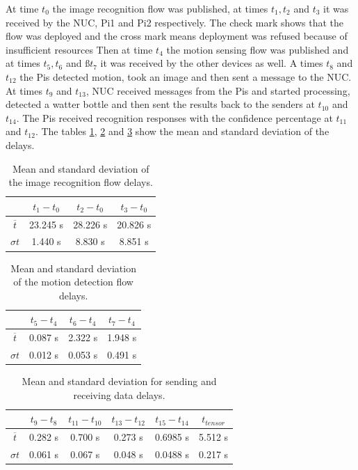 \noindent At time $t_0$ the image recognition flow was published, at times $t_1, t_2$ and   $t_3$ it was received by the NUC, Pi1 and Pi2 respectively. The check mark shows that the flow was deployed and the cross mark means deployment was refused because of insufficient resources Then at time $t_4$ the motion sensing flow was published and at times $t_5,t_6$ and $ßt_7$ it was received by the other devices as well. A times $t_8$ and $t_{12}$  the Pis detected motion, took an image and then sent a message to the NUC. At times $t_9$ and $t_{13}$,  NUC received messages from the Pis and started processing, detected a watter bottle and then sent the  results back to the senders at $t_{10}$ and $t_{14}$. The Pis received recognition responses with the confidence percentage at $t_{11}$ and $t_{12}$.  The tables \ref{table:tensor}, \ref{table:motion} and \ref{table:data} show the mean and standard deviation of the delays.  
\begin{table}[H]
\centering
\begin{tabular}{c|c|c|c}\toprule
&$t_1 - t_0$  & $t_2 - t_0$  & $t_3-t_0$ \\ \midrule
$ \overline{t} $&	23.245 s&28.226 s&20.826 s\\ 
$ \sigma t $ &1.440 s&8.830 s&8.851 s\\
\end{tabular}
\caption{Mean and standard deviation of the image recognition flow delays.}
\label{table:tensor}
\end{table}


\begin{table}[H]
\centering
\begin{tabular}{c|c|c|c}\toprule
&$t_5 - t_4$  & $t_6 - t_4$  & $t_7-t_4$ \\ \midrule
$ \overline{t} $ &0.087 s&2.322 s&1.948 s\\
$ \sigma t $&0.012 s&0.053 s&0.491 s\\
\end{tabular}
\caption{Mean and standard deviation of the motion detection flow delays.}
\label{table:motion}
\end{table}

\begin{table}[H]
\centering
\begin{tabular}{c|c|c|c|c|c}	\toprule
&$t_9 - t_8$  & $t_{11} - t_{10}$  & $t_{13}-t_{12}$ & $t_{15}-t_{14}$&  $t_{tensor}$ \\ \midrule
$ \overline{t} $&0.282 s&0.700 s&	0.273 s&0.6985 s&5.512 s\\
$ \sigma t $&0.061 s&0.067 s&	0.048 s&0.0488 s&0.217 s\\
	\end{tabular}
	\caption{Mean and standard deviation for sending and receiving data delays.}
	\label{table:data}
\end{table}

